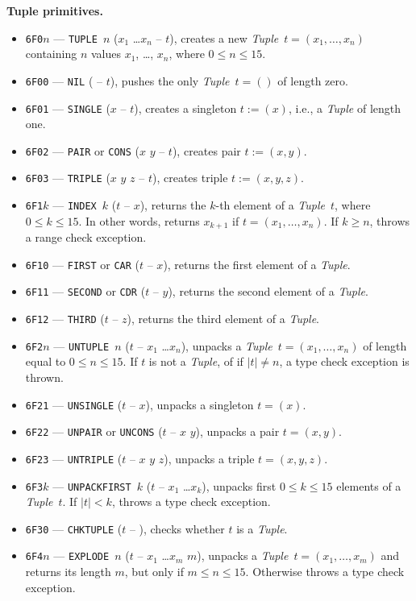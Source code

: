 \documentclass[12pt,oneside]{article}
\def\makepoint#1{\medbreak\noindent{\bf #1.\ }}
\def\nxsubpoint{\refstepcounter{subsubsection}%
  \smallbreak\makepoint{\thesubsubsection}}
\def\emb#1{\textbf{#1.}}
\begin{document}
\nxsubpoint\emb{Tuple primitives}\label{sp:prim.tuple}
\begin{itemize}
\item {\tt 6F0$n$} --- {\tt TUPLE $n$} ($x_1$ \dots $x_n$ -- $t$), creates a new {\em Tuple\/}~$t=(x_1,\ldots,x_n)$ containing $n$ values $x_1$, \dots, $x_n$, where $0\leq n\leq 15$.
\item {\tt 6F00} --- {\tt NIL} ( -- $t$), pushes the only {\em Tuple\/}~$t=()$ of length zero.
\item {\tt 6F01} --- {\tt SINGLE} ($x$ -- $t$), creates a singleton $t:=(x)$, i.e., a {\em Tuple\/} of length one.
\item {\tt 6F02} --- {\tt PAIR} or {\tt CONS} ($x$ $y$ -- $t$), creates pair $t:=(x,y)$.
\item {\tt 6F03} --- {\tt TRIPLE} ($x$ $y$ $z$ -- $t$), creates triple $t:=(x,y,z)$.
\item {\tt 6F1$k$} --- {\tt INDEX $k$} ($t$ -- $x$), returns the $k$-th element of a {\em Tuple\/}~$t$, where $0\leq k\leq 15$. In other words, returns $x_{k+1}$ if $t=(x_1,\ldots,x_n)$. If $k\geq n$, throws a range check exception.
\item {\tt 6F10} --- {\tt FIRST} or {\tt CAR} ($t$ -- $x$), returns the first element of a {\em Tuple}.
\item {\tt 6F11} --- {\tt SECOND} or {\tt CDR} ($t$ -- $y$), returns the second element of a {\em Tuple}.
\item {\tt 6F12} --- {\tt THIRD} ($t$ -- $z$), returns the third element of a {\em Tuple}.
\item {\tt 6F2$n$} --- {\tt UNTUPLE $n$} ($t$ -- $x_1$ \dots $x_n$), unpacks a {\em Tuple\/}~$t=(x_1,\ldots,x_n)$ of length equal to $0\leq n\leq 15$. If $t$ is not a {\em Tuple}, of if $|t|\neq n$, a type check exception is thrown.
\item {\tt 6F21} --- {\tt UNSINGLE} ($t$ -- $x$), unpacks a singleton $t=(x)$.
\item {\tt 6F22} --- {\tt UNPAIR} or {\tt UNCONS} ($t$ -- $x$ $y$), unpacks a pair $t=(x,y)$.
\item {\tt 6F23} --- {\tt UNTRIPLE} ($t$ -- $x$ $y$ $z$), unpacks a triple $t=(x,y,z)$.
\item {\tt 6F3$k$} --- {\tt UNPACKFIRST $k$} ($t$ -- $x_1$ \dots $x_k$), unpacks first $0\leq k\leq 15$ elements of a {\em Tuple\/}~$t$. If $|t|<k$, throws a type check exception.
\item {\tt 6F30} --- {\tt CHKTUPLE} ($t$ -- ), checks whether $t$ is a {\em Tuple}.
\item {\tt 6F4$n$} --- {\tt EXPLODE $n$} ($t$ -- $x_1$ \dots $x_m$ $m$), unpacks a {\em Tuple\/}~$t=(x_1,\ldots,x_m)$ and returns its length $m$, but only if $m\leq n\leq 15$. Otherwise throws a type check exception.

\end{itemize}
\end{document}
